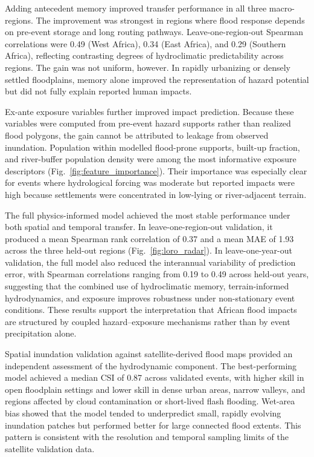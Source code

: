 \documentclass[pdflatex,sn-mathphys-ay]{sn-jnl}
\theoremstyle{thmstyleone}
\theoremstyle{thmstylethree}
\theoremstyle{thmstyletwo}
\begin{document}
Adding antecedent memory improved transfer performance in all three
macro-regions.  The improvement was strongest in regions where flood
response depends on pre-event storage and long routing pathways.
Leave-one-region-out Spearman correlations were 0.49 (West Africa),
0.34 (East Africa), and 0.29 (Southern Africa), reflecting contrasting
degrees of hydroclimatic predictability across regions.  The gain was
not uniform, however.  In rapidly urbanizing or densely settled
floodplains, memory alone improved the representation of hazard
potential but did not fully explain reported human impacts.

Ex-ante exposure variables further improved impact prediction.  Because
these variables were computed from pre-event hazard supports rather
than realized flood polygons, the gain cannot be attributed to leakage
from observed inundation.  Population within modelled flood-prone
supports, built-up fraction, and river-buffer population density were
among the most informative exposure descriptors
(Fig.~\ref{fig:feature_importance}).  Their importance was especially
clear for events where hydrological forcing was moderate but reported
impacts were high because settlements were concentrated in low-lying or
river-adjacent terrain.

The full physics-informed model achieved the most stable performance
under both spatial and temporal transfer.  In leave-one-region-out
validation, it produced a mean Spearman rank correlation of 0.37 and a
mean MAE of 1.93 across the three held-out regions
(Fig.~\ref{fig:loro_radar}).  In leave-one-year-out validation, the
full model also reduced the interannual variability of prediction
error, with Spearman correlations ranging from 0.19 to 0.49 across
held-out years, suggesting that the combined use of hydroclimatic
memory, terrain-informed hydrodynamics, and exposure improves
robustness under non-stationary event conditions.  These results support the interpretation that African
flood impacts are structured by coupled hazard--exposure mechanisms
rather than by event precipitation alone.

Spatial inundation validation against satellite-derived flood maps
provided an independent assessment of the hydrodynamic component.  The
best-performing model achieved a median CSI of 0.87 across validated
events, with higher skill in open floodplain settings and lower skill
in dense urban areas, narrow valleys, and regions affected by cloud
contamination or short-lived flash flooding.  Wet-area bias showed that
the model tended to underpredict small, rapidly evolving inundation
patches but performed better for large connected flood extents.  This
pattern is consistent with the resolution and temporal sampling limits
of the satellite validation data.
\end{document}
